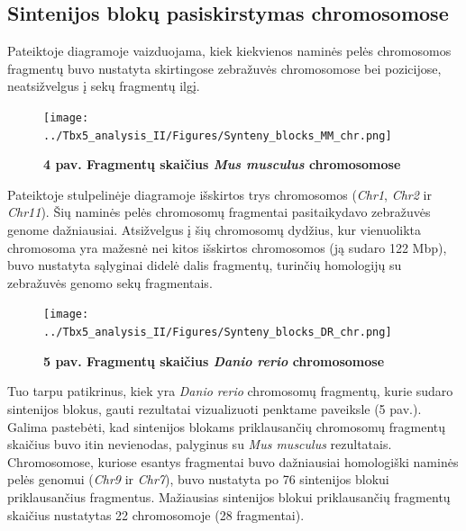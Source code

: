 \documentclass[12pt]{article}
\begin{document}
\subsection{Sintenijos blokų pasiskirstymas chromosomose}
Pateiktoje diagramoje vaizduojama, kiek kiekvienos naminės pelės chromosomos
fragmentų buvo nustatyta skirtingose zebražuvės chromosomose bei pozicijose,
neatsižvelgus į sekų fragmentų ilgį.

\begin{figure}[htb]
    \begin{center}
        \texttt{[image: ../Tbx5\_analysis\_II/Figures/Synteny\_blocks\_MM\_chr.png]}
        \vspace{-1\baselineskip}
        \caption*{\small\textbf{4 pav. Fragmentų skaičius \emph{Mus musculus}
        chromosomose}}
        \label{fig:birds}
    \end{center}
\end{figure}

Pateiktoje stulpelinėje diagramoje išskirtos trys chromosomos (\emph{Chr1},
\emph{Chr2} ir \emph{Chr11}). Šių naminės pelės chromosomų fragmentai
pasitaikydavo zebražuvės genome dažniausiai. Atsižvelgus į šių chromosomų
dydžius, kur vienuolikta chromosoma yra mažesnė nei kitos išskirtos chromosomos
(ją sudaro 122 Mbp\cite{MGI}), buvo nustatyta sąlyginai didelė dalis fragmentų,
turinčių homologijų su zebražuvės genomo sekų fragmentais.

\begin{figure}[htb]
    \begin{center}
        \texttt{[image: ../Tbx5\_analysis\_II/Figures/Synteny\_blocks\_DR\_chr.png]}
        \vspace{-1\baselineskip}
        \caption*{\small\textbf{5 pav. Fragmentų skaičius \emph{Danio rerio}
        chromosomose}}
        \label{fig:birds}
    \end{center}
\end{figure}

Tuo tarpu patikrinus, kiek yra \emph{Danio rerio} chromosomų fragmentų, kurie
sudaro sintenijos blokus, gauti rezultatai vizualizuoti penktame paveiksle
(5 pav.). Galima pastebėti, kad sintenijos blokams priklausančių chromosomų
fragmentų skaičius buvo itin nevienodas, palyginus su \emph{Mus musculus}
rezultatais. Chromosomose, kuriose esantys fragmentai buvo dažniausiai
homologiški naminės pelės genomui (\emph{Chr9} ir \emph{Chr7}), buvo nustatyta
po 76 sintenijos blokui priklausančius fragmentus. Mažiausias sintenijos blokui
priklausančių fragmentų skaičius nustatytas 22 chromosomoje (28 fragmentai).
\end{document}
